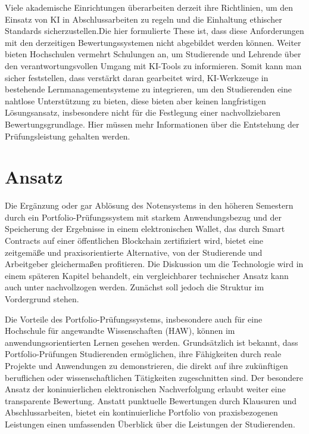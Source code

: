 \documentclass[conference]{IEEEtran}
\begin{document}
Viele akademische Einrichtungen überarbeiten derzeit ihre \cite{mrass2023chatgpt}Richtlinien, um den Einsatz von KI in Abschlussarbeiten zu regeln und die Einhaltung ethischer Standards sicherzustellen.Die hier formulierte These ist, dass diese Anforderungen mit den derzeitigen Bewertungssystemen nicht abgebildet werden können. Weiter bieten Hochschulen vermehrt Schulungen an, um Studierende und Lehrende über den verantwortungsvollen Umgang mit KI-Tools zu informieren. Somit kann man sicher feststellen, dass verstärkt daran gearbeitet wird, KI-Werkzeuge in bestehende Lernmanagementsysteme zu integrieren, um den Studierenden eine nahtlose Unterstützung zu bieten, diese bieten aber keinen langfristigen Lösungsansatz, insbesondere nicht für die Festlegung einer nachvollziebaren Bewertungsgrundlage. Hier müssen mehr Informationen über die Entstehung der Prüfungsleistung gehalten werden.

\section{Ansatz}

Die Ergänzung oder gar Ablösung des Notensystems in den höheren Semestern durch ein Portfolio-Prüfungssystem mit starkem Anwendungsbezug und der Speicherung der Ergebnisse in einem elektronischen Wallet, das durch Smart Contracts auf einer öffentlichen Blockchain zertifiziert wird, bietet eine zeitgemäße und praxisorientierte Alternative, von der Studierende und Arbeitgeber gleichermaßen profitieren. Die Diskussion um die Technologie wird in einem späteren Kapitel behandelt, ein vergleichbarer technischer Ansatz kann auch unter \cite{Idee} nachvollzogen werden. Zunächst soll jedoch die Struktur im Vordergrund stehen. 

Die Vorteile des Portfolio-Prüfungssystems, insbesondere auch für eine Hochschule für angewandte Wissenschaften (HAW), können im anwendungsorientierten Lernen gesehen werden. Grundsätzlich ist bekannt, dass Portfolio-Prüfungen Studierenden ermöglichen, ihre Fähigkeiten durch reale Projekte und Anwendungen zu demonstrieren, die direkt auf ihre zukünftigen beruflichen oder wissenschaftlichen Tätigkeiten zugeschnitten sind. Der besondere Ansatz der koninuierlichen elektronischen Nachverfolgung erlaubt weiter eine transparente Bewertung. Anstatt punktuelle Bewertungen durch Klausuren und Abschlussarbeiten, bietet ein kontinuierliche Portfolio von praxisbezogenen Leistungen einen umfassenden Überblick über die Leistungen der Studierenden.
\end{document}
